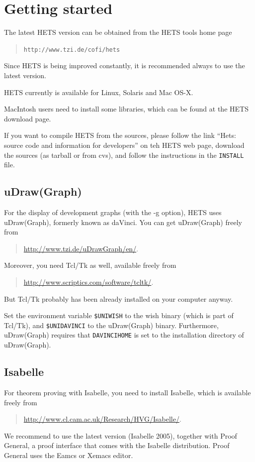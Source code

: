 \documentclass{article}
\newcommand{\normalTEXTSC}[2]{{#1\scriptsize#2}}
\newcommand     {\Hets}{\normalTEXTSC{H}{ETS}\xspace}
\begin{document}
\section{Getting started}
 
The latest \Hets version can be obtained from the
\Hets tools home page
\begin{quote}
\texttt{http://www.tzi.de/cofi/hets}
\end{quote}
 Since \Hets is being
improved constantly, it is recommended always to use the latest version.

\Hets currently is available for Linux, Solaris and
Mac OS-X. 

MacIntosh users need to install some libraries, which can be found
at the \Hets download page.

If you want to compile \Hets from the sources, please follow the
link ``Hets: source code and information for developers''
on teh \Hets web page, download the sources (as tarball or from
cvs), and follow the
instructions in the \texttt{INSTALL} file.

\subsection*{uDraw(Graph)}
For the display of development graphs (with the -g option), \Hets uses
uDraw(Graph), formerly known as daVinci.
You can get uDraw(Graph) freely from 
\begin{quote}
\url{http://www.tzi.de/uDrawGraph/en/}.
\end{quote}
Moreover, you need Tcl/Tk as well, available freely from
\begin{quote}
\url{http://www.scriptics.com/software/tcltk/}.
\end{quote}
But Tcl/Tk probably has been already installed
on your computer anyway.

Set the environment variable \texttt{\$UNIWISH} to the wish binary
(which is part of Tcl/Tk), and \texttt{\$UNIDAVINCI} to the
uDraw(Graph) binary. Furthermore, uDraw(Graph) requires that
\texttt{DAVINCIHOME} is set to the installation directory of
uDraw(Graph).

\subsection*{Isabelle}

For theorem proving with Isabelle, you need to install Isabelle,
which is available freely from 
\begin{quote}
\url{http://www.cl.cam.ac.uk/Research/HVG/Isabelle/}.
\end{quote}
We recommend to use the latest version (Isabelle 2005), together
with Proof General, a proof interface that comes with the Isabelle
distribution. Proof General uses the Eamcs or Xemacs editor.
\end{document}
